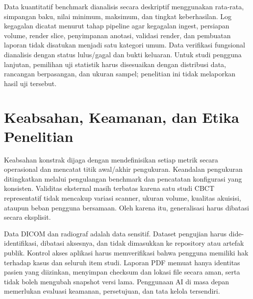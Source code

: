 \documentclass[12pt,a4paper,oneside]{report}
\begin{document}
Data kuantitatif benchmark dianalisis secara deskriptif menggunakan rata-rata, simpangan baku, nilai minimum, maksimum, dan tingkat keberhasilan. Log kegagalan dicatat menurut tahap pipeline agar kegagalan ingest, persiapan volume, render slice, penyimpanan anotasi, validasi render, dan pembuatan laporan tidak disatukan menjadi satu kategori umum. Data verifikasi fungsional dianalisis dengan status lulus/gagal dan bukti keluaran. Untuk studi pengguna lanjutan, pemilihan uji statistik harus disesuaikan dengan distribusi data, rancangan berpasangan, dan ukuran sampel; penelitian ini tidak melaporkan hasil uji tersebut.

\section{Keabsahan, Keamanan, dan Etika Penelitian}

Keabsahan konstrak dijaga dengan mendefinisikan setiap metrik secara operasional dan mencatat titik awal/akhir pengukuran. Keandalan pengukuran ditingkatkan melalui pengulangan benchmark dan pencatatan konfigurasi yang konsisten. Validitas eksternal masih terbatas karena satu studi CBCT representatif tidak mencakup variasi scanner, ukuran volume, kualitas akuisisi, ataupun beban pengguna bersamaan. Oleh karena itu, generalisasi harus dibatasi secara eksplisit.

Data DICOM dan radiograf adalah data sensitif. Dataset pengujian harus dide-identifikasi, dibatasi aksesnya, dan tidak dimasukkan ke repository atau artefak publik. Kontrol akses aplikasi harus memverifikasi bahwa pengguna memiliki hak terhadap kasus dan seluruh item studi. Laporan PDF memuat hanya identitas pasien yang diizinkan, menyimpan checksum dan lokasi file secara aman, serta tidak boleh mengubah snapshot versi lama. Penggunaan AI di masa depan memerlukan evaluasi keamanan, persetujuan, dan tata kelola tersendiri.
\end{document}
